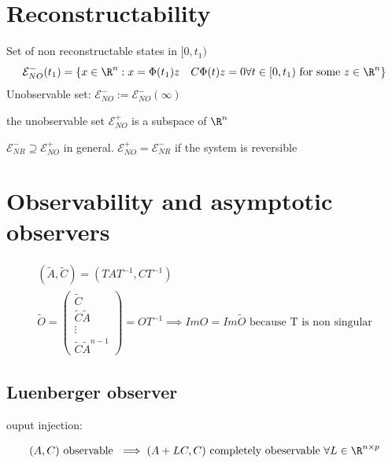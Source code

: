 \documentclass[english]{lectures}
\begin{document}
\section{Reconstructability}
\begin{definition}
    Set of non reconstructable states in $[0,t_1)$
    \[
        \mathcal{E}^-_{NO}(t_1) = \{x\in \R^n :x=\Phi(t_1)z \quad C\Phi(t)z=0 \forall t \in [0,t_1) \text{ for some } z\in \R^n\}
    \]
    Unobservable set: $\mathcal{E}^-_{NO}:=\mathcal{E}^-_{NO}(\infty)$
\end{definition}
\begin{result}
    the unobservable set $\mathcal{E}^+_{NO}$ is a subspace of $\R^n$
\end{result}
\begin{theorem}
    \( \mathcal{E}^-_{NR} \supseteq \mathcal{E}^+_{NO} \) in general. \(\mathcal{E}^+_{NO} = \mathcal{E}^-_{NR}\) if the system is reversible
\end{theorem}

\section{Observability and asymptotic observers}
\begin{gather*}
    (\tilde{A}, \tilde{C})=(TAT^{-1},CT^{-1})\\
    \tilde{O}=\begin{pmatrix}
        \tilde{C} \\ \tilde{C}\tilde{A} \\ \vdots \\ \tilde{C}\tilde{A}^{n-1}
    \end{pmatrix}=OT^{-1} \implies ImO=Im\tilde{O} \text{ because T is non singular}
\end{gather*}
\subsection{Luenberger observer}
ouput injection:
\begin{result}
    \[
    (A,C) \text{ observable } \implies (A+LC,C) \text{ completely obeservable } \forall L \in \R^{n \times p}      
\]
\end{result}
\end{document}
